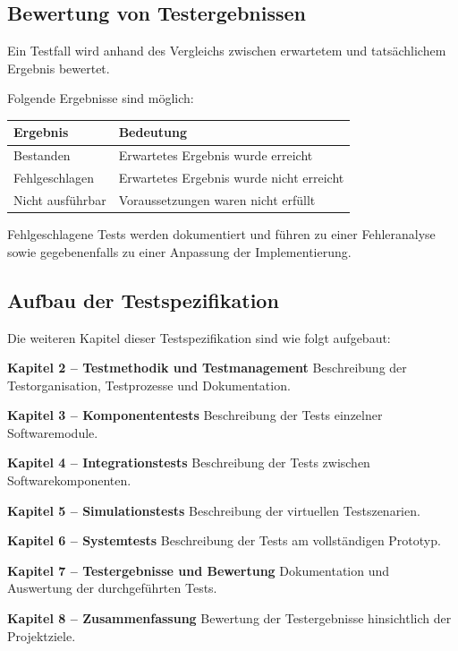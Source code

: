 \documentclass[
  a4paper,
  12pt,
  DIV=12,        %
  parskip=half,  %
  headings=small %
]{scrartcl}
\theoremstyle{definition}
\theoremstyle{definition}
\begin{document}
\subsection{Bewertung von
Testergebnissen}\label{bewertung-von-testergebnissen}

Ein Testfall wird anhand des Vergleichs zwischen erwartetem und
tatsächlichem Ergebnis bewertet.

Folgende Ergebnisse sind möglich:

\begin{longtable}[]{@{}ll@{}}
\toprule\noalign{}
Ergebnis & Bedeutung \\
\midrule\noalign{}
\endhead
\bottomrule\noalign{}
\endlastfoot
Bestanden & Erwartetes Ergebnis wurde erreicht \\
Fehlgeschlagen & Erwartetes Ergebnis wurde nicht erreicht \\
Nicht ausführbar & Voraussetzungen waren nicht erfüllt \\
\end{longtable}

Fehlgeschlagene Tests werden dokumentiert und führen zu einer
Fehleranalyse sowie gegebenenfalls zu einer Anpassung der
Implementierung.

\subsection{Aufbau der
Testspezifikation}\label{aufbau-der-testspezifikation}

Die weiteren Kapitel dieser Testspezifikation sind wie folgt aufgebaut:

\textbf{Kapitel 2 -- Testmethodik und Testmanagement} Beschreibung der
Testorganisation, Testprozesse und Dokumentation.

\textbf{Kapitel 3 -- Komponententests} Beschreibung der Tests einzelner
Softwaremodule.

\textbf{Kapitel 4 -- Integrationstests} Beschreibung der Tests zwischen
Softwarekomponenten.

\textbf{Kapitel 5 -- Simulationstests} Beschreibung der virtuellen
Testszenarien.

\textbf{Kapitel 6 -- Systemtests} Beschreibung der Tests am
vollständigen Prototyp.

\textbf{Kapitel 7 -- Testergebnisse und Bewertung} Dokumentation und
Auswertung der durchgeführten Tests.

\textbf{Kapitel 8 -- Zusammenfassung} Bewertung der Testergebnisse
hinsichtlich der Projektziele.
\end{document}
